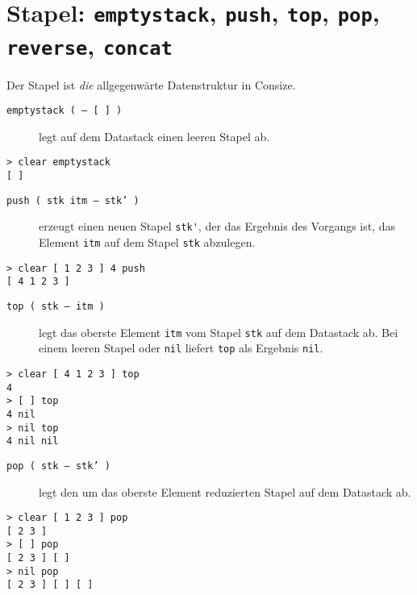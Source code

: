 \section{Stapel: \texttt{emptystack}, \texttt{push}, \texttt{top}, \texttt{pop}, \texttt{reverse}, \texttt{concat}}

Der Stapel ist \emph{die} allgegenwärte Datenstruktur in Consize.

\begin{description}
\item[\texttt{emptystack ( -- [ ] )}] legt auf dem Datastack einen leeren Stapel ab.
\end{description}

\begin{verbatim}
> clear emptystack
[ ]
\end{verbatim}

\begin{description}
\item[\texttt{push ( stk itm -- stk' )}] erzeugt einen neuen Stapel \verb|stk'|, der das Ergebnis des Vorgangs ist, das Element \verb|itm| auf dem Stapel \verb|stk| abzulegen.
\end{description}

\begin{verbatim}
> clear [ 1 2 3 ] 4 push
[ 4 1 2 3 ]
\end{verbatim}

\begin{description}
\item[\texttt{top ( stk -- itm )}] legt das oberste Element \verb|itm| vom Stapel \verb|stk| auf dem Datastack ab. Bei einem leeren Stapel oder \verb|nil| liefert \verb|top| als Ergebnis \verb|nil|. 
\end{description}

\begin{verbatim}
> clear [ 4 1 2 3 ] top
4
> [ ] top
4 nil
> nil top
4 nil nil
\end{verbatim}

\begin{description}
\item[\texttt{pop ( stk -- stk' )}] legt den um das oberste Element reduzierten Stapel auf dem Datastack ab.
\end{description}

\begin{verbatim}
> clear [ 1 2 3 ] pop
[ 2 3 ]
> [ ] pop
[ 2 3 ] [ ]
> nil pop
[ 2 3 ] [ ] [ ]
\end{verbatim}

